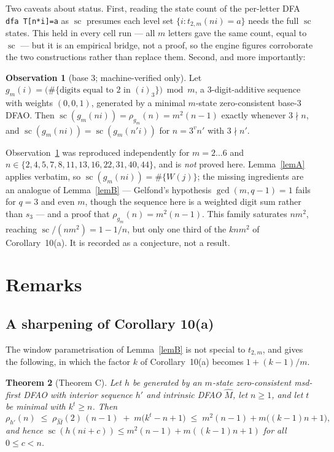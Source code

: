 \documentclass[10pt,reqno]{amsart}
\theoremstyle{plain}
\newtheorem{theorem}{Theorem}
\theoremstyle{definition}
\newtheorem{observation}[theorem]{Observation}
\theoremstyle{remark}
\numberwithin{theorem}{section}
\DeclareMathOperator{\sco}{sc}
\newcommand{\tm}{t_{2,m}}
\begin{document}
Two caveats about status. First, reading the state count of the per-letter DFA
\verb|dfa T[n*i]=a| as $\sco$ presumes each level set $\{i : \tm(ni) = a\}$ needs the full
$\sco$ states. This held in every cell run --- all $m$ letters gave the same count, equal to
$\sco$ --- but it is an empirical bridge, not a proof, so the engine figures corroborate the
two constructions rather than replace them. Second, and more importantly:

\begin{observation}[base 3; machine-verified only]
\label{obsB}
Let $g_m(i) = \bigl(\#\{\text{digits equal to } 2 \text{ in } (i)_3\}\bigr) \bmod m$, a
$3$-digit-additive sequence with weights $(0,0,1)$, generated by a minimal $m$-state
zero-consistent base-$3$ DFAO. Then $\sco(g_m(ni)) = \rho_{g_m}(n) = m^2(n-1)$ exactly
whenever $3 \nmid n$, and $\sco(g_m(ni)) = \sco(g_m(n'i))$ for $n = 3^{v}n'$ with
$3 \nmid n'$.
\end{observation}

Observation~\ref{obsB} was reproduced independently for $m = 2 \dots 6$ and
$n \in \{2,4,5,7,8,11,13,16,22,31,40,44\}$, and is \emph{not} proved here. Lemma~\ref{lemA}
applies verbatim, so $\sco(g_m(ni)) = \#\{W(j)\}$; the missing ingredients are an analogue
of Lemma~\ref{lemB} --- Gelfond's hypothesis $\gcd(m,q-1)=1$ fails for $q = 3$ and even $m$,
though the sequence here is a weighted digit sum rather than $s_3$ --- and a proof that
$\rho_{g_m}(n) = m^2(n-1)$. This family saturates $nm^2$, reaching $\sco/(nm^2) = 1 - 1/n$,
but only one third of the $knm^2$ of Corollary~10(a). It is recorded as a conjecture, not a
result.

\section{Remarks}
\label{sec:remarks}

\subsection*{A sharpening of Corollary 10(a)}
The window parametrisation of Lemma~\ref{lemB} is not special to $\tm$, and gives the
following, in which the factor $k$ of Corollary~10(a) becomes $1 + (k-1)/m$.

\begin{theorem}[Theorem C]
\label{thmC}
Let $h$ be generated by an $m$-state \emph{zero-consistent} msd-first DFAO with interior
sequence $h'$ and intrinsic DFAO $\widehat M$, let $n \ge 1$, and let $t$ be minimal with
$k^t \ge n$. Then
\[
  \rho_{h'}(n) \;\le\; \rho_{\widehat M}(2)\,(n-1) \;+\; m\bigl(k^t - n + 1\bigr)
  \;\le\; m^2(n-1) + m\bigl((k-1)n + 1\bigr),
\]
and hence $\sco(h(ni+c)) \le m^2(n-1) + m((k-1)n+1)$ for all $0 \le c < n$.
\end{theorem}
\end{document}
